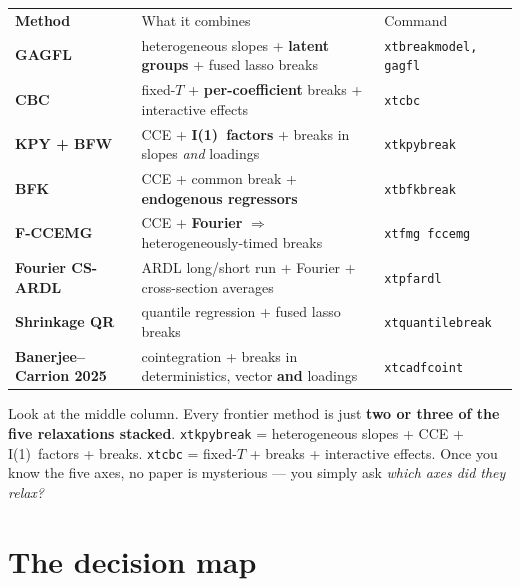 \documentclass[11pt,a4paper]{article}
\newcommand{\cmd}[1]{\texttt{\textcolor{corange}{#1}}}
\newcommand{\Ito}{I(1)}
\begin{document}
\begin{center}
\begin{tabular}{@{}>{\bfseries}l p{7.4cm} l@{}}
\rowcolor{cgrape}\color{white}Method & \color{white}What it combines & \color{white}Command\\
GAGFL & heterogeneous slopes + \textbf{latent groups} + fused lasso breaks & \cmd{xtbreakmodel, gagfl}\\
CBC & fixed-$T$ + \textbf{per-coefficient} breaks + interactive effects & \cmd{xtcbc}\\
KPY + BFW & CCE + \textbf{\Ito\ factors} + breaks in slopes \emph{and} loadings & \cmd{xtkpybreak}\\
BFK & CCE + common break + \textbf{endogenous regressors} & \cmd{xtbfkbreak}\\
F-CCEMG & CCE + \textbf{Fourier} $\Rightarrow$ heterogeneously-timed breaks & \cmd{xtfmg fccemg}\\
Fourier CS-ARDL & ARDL long/short run + Fourier + cross-section averages & \cmd{xtpfardl}\\
Shrinkage QR & quantile regression + fused lasso breaks & \cmd{xtquantilebreak}\\
Banerjee--Carrion 2025 & cointegration + breaks in deterministics, vector \textbf{and} loadings & \cmd{xtcadfcoint}\\
\end{tabular}
\end{center}

\begin{idea}
Look at the middle column. Every frontier method is just \textbf{two or three of the five
relaxations stacked}. \cmd{xtkpybreak} = heterogeneous slopes + CCE + \Ito\ factors + breaks.
\cmd{xtcbc} = fixed-$T$ + breaks + interactive effects. Once you know the five axes, no paper is
mysterious --- you simply ask \emph{which axes did they relax?}
\end{idea}

\section{The decision map}
\end{document}
